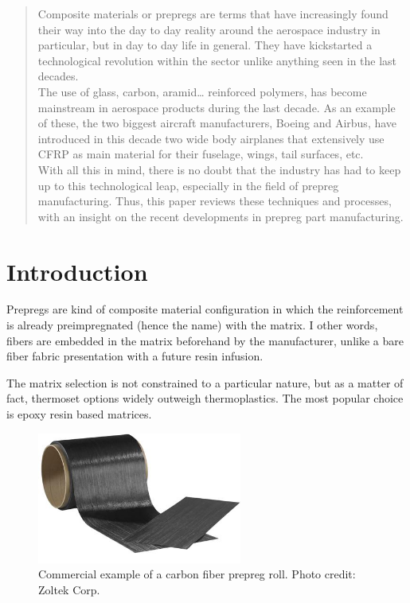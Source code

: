 \begin{abstract}

Composite materials or prepregs are terms that have increasingly found their
way into the day to day reality around the aerospace industry in particular, but
in day to day life in general. They have kickstarted a technological revolution
within the sector unlike anything seen in the last decades.\\

The use of glass, carbon, aramid… reinforced polymers, has become mainstream
in aerospace products during the last decade. As an example of these, the two
biggest aircraft manufacturers, Boeing and Airbus, have introduced in this decade
two wide body airplanes that extensively use CFRP as main material for their fuselage,
wings, tail surfaces, etc.\\

With all this in mind, there is no doubt that the industry has had to keep up
to this technological leap, especially in the field of prepreg manufacturing.
Thus, this paper reviews these techniques and processes, with an insight on the
recent developments in prepreg part manufacturing.\\

\end{abstract}

\section{Introduction}

Prepregs are kind of composite material configuration in which the reinforcement
is already preimpregnated (hence the name) with the matrix. I other words, fibers
are embedded in the matrix beforehand by the manufacturer, unlike a bare fiber
fabric presentation with a future resin infusion.

The matrix selection is not constrained to a particular nature, but as a matter
of fact, thermoset options widely outweigh thermoplastics. The most popular choice
is epoxy resin based matrices.

\begin{figure}[h]
	\centering
	\includegraphics[width=0.6\textwidth]{img/prepreg_roll.jpg}
	\caption[Carbon fiber prepreg roll]{Commercial example of a carbon fiber prepreg roll.
	Photo credit: Zoltek Corp.}
	\label{fig:prepreg_roll}
\end{figure}

